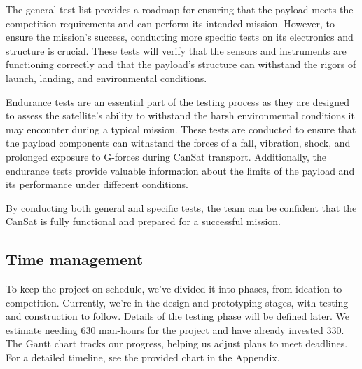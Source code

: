 The general test list provides a roadmap for ensuring that the payload meets the competition requirements and can perform its intended mission. However, to ensure the mission's success, conducting more specific tests on its electronics and structure is crucial. These tests will verify that the sensors and instruments are functioning correctly and that the payload's structure can withstand the rigors of launch, landing, and environmental conditions.

Endurance tests are an essential part of the testing process as they are designed to assess the satellite's ability to withstand the harsh environmental conditions it may encounter during a typical mission. These tests are conducted to ensure that the payload components can withstand the forces of a fall, vibration, shock, and prolonged exposure to G-forces during CanSat transport. Additionally, the endurance tests provide valuable information about the limits of the payload and its performance under different conditions. 

By conducting both general and specific tests, the team can be confident that the CanSat is fully functional and prepared for a successful mission.


\subsection{Time management}
To keep the project on schedule, we've divided it into phases, from ideation to competition. Currently, we're in the design and prototyping stages, with testing and construction to follow. Details of the testing phase will be defined later. We estimate needing 630 man-hours for the project and have already invested 330. The Gantt chart tracks our progress, helping us adjust plans to meet deadlines. For a detailed timeline, see the provided chart in the Appendix. 

